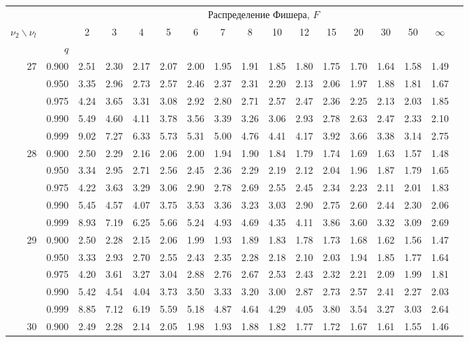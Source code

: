 \documentclass[pdftex,11pt,openany]{book}\usepackage[]{graphicx}\usepackage[]{color}
\begin{document}
{\begin{center}
\begin{tabular}{rrr@{\,}r@{\,}r@{\,}r@{\,}r@{\,}r@{\,}r@{\,}r
                   @{\,}r@{\,}r@{\,}r@{\,}r@{\,}r@{\,}r@{\,}r}
&&\multicolumn{14}{c}{Распределение Фишера, $F$}
\ \\
$\nu_2\backslash\nu_l$ & & 
\multicolumn{1}{c}{2} &\multicolumn{1}{c}{3} &
\multicolumn{1}{c}{4} &\multicolumn{1}{c}{5} &
\multicolumn{1}{c}{6} &\multicolumn{1}{c}{7} &
\multicolumn{1}{c}{8} &\multicolumn{1}{c}{10}&
\multicolumn{1}{c}{12}&\multicolumn{1}{c}{15}&
\multicolumn{1}{c}{20}&\multicolumn{1}{c}{30}&
\multicolumn{1}{c}{50}&\multicolumn{1}{c}{$\infty$}\\
& $q$ \\
27&0.900&2.51&2.30&2.17&2.07&2.00&1.95&1.91&1.85&1.80&1.75&1.70&1.64&1.58&1.49\\
  &0.950&3.35&2.96&2.73&2.57&2.46&2.37&2.31&2.20&2.13&2.06&1.97&1.88&1.81&1.67\\
  &0.975&4.24&3.65&3.31&3.08&2.92&2.80&2.71&2.57&2.47&2.36&2.25&2.13&2.03&1.85\\
  &0.990&5.49&4.60&4.11&3.78&3.56&3.39&3.26&3.06&2.93&2.78&2.63&2.47&2.33&2.10\\
  &0.999&9.02&7.27&6.33&5.73&5.31&5.00&4.76&4.41&4.17&3.92&3.66&3.38&3.14&2.75\\
28&0.900&2.50&2.29&2.16&2.06&2.00&1.94&1.90&1.84&1.79&1.74&1.69&1.63&1.57&1.48\\
  &0.950&3.34&2.95&2.71&2.56&2.45&2.36&2.29&2.19&2.12&2.04&1.96&1.87&1.79&1.65\\
  &0.975&4.22&3.63&3.29&3.06&2.90&2.78&2.69&2.55&2.45&2.34&2.23&2.11&2.01&1.83\\
  &0.990&5.45&4.57&4.07&3.75&3.53&3.36&3.23&3.03&2.90&2.75&2.60&2.44&2.30&2.06\\
  &0.999&8.93&7.19&6.25&5.66&5.24&4.93&4.69&4.35&4.11&3.86&3.60&3.32&3.09&2.69\\
29&0.900&2.50&2.28&2.15&2.06&1.99&1.93&1.89&1.83&1.78&1.73&1.68&1.62&1.56&1.47\\
  &0.950&3.33&2.93&2.70&2.55&2.43&2.35&2.28&2.18&2.10&2.03&1.94&1.85&1.77&1.64\\
  &0.975&4.20&3.61&3.27&3.04&2.88&2.76&2.67&2.53&2.43&2.32&2.21&2.09&1.99&1.81\\
  &0.990&5.42&4.54&4.04&3.73&3.50&3.33&3.20&3.00&2.87&2.73&2.57&2.41&2.27&2.03\\
  &0.999&8.85&7.12&6.19&5.59&5.18&4.87&4.64&4.29&4.05&3.80&3.54&3.27&3.03&2.64\\
30&0.900&2.49&2.28&2.14&2.05&1.98&1.93&1.88&1.82&1.77&1.72&1.67&1.61&1.55&1.46\\

\end{tabular}
\end{center}}
\end{document}
